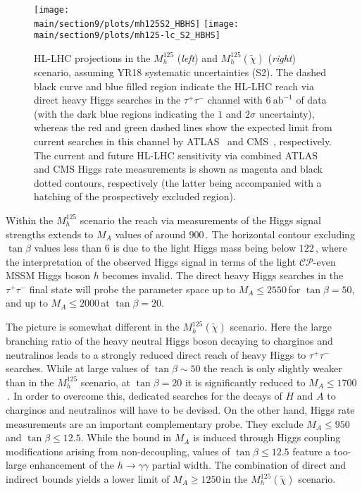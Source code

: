 \begin{figure}
\begin{center}
\texttt{[image: \\main/section9/plots/mh125S2\_HBHS]}\hfill
\texttt{[image: \\main/section9/plots/mh125-lc\_S2\_HBHS]}
\end{center}
\caption{HL-LHC projections in the $M_h^{125}$ (\emph{left}) and
  $M_h^{125}(\tilde{\chi})$ (\emph{right}) scenario, assuming YR18 systematic uncertainties (S2). The dashed black curve and blue filled region indicate the HL-LHC reach via direct heavy Higgs searches in the $\tau^+\tau^-$ channel with $6~\mathrm{ab}^{-1}$ of data (with the dark blue regions indicating the $1$ and $2\sigma$ uncertainty), whereas 
  the red and green dashed lines show the expected limit from current searches in this channel by ATLAS~\cite{Aaboud:2017sjh} and CMS~\cite{Sirunyan:2018zut}, respectively. The current and future HL-LHC sensitivity via  combined ATLAS and CMS Higgs rate measurements is shown as magenta and black dotted contours, respectively (the latter being accompanied with a hatching of the prospectively excluded region).}
\label{fig:bench}
\end{figure}

Within the $M_h^{125}$ scenario the reach via measurements of the Higgs signal strengths extends to $M_A$ values of around $900$\,\UGeV. The horizontal contour excluding $\tan\beta$ values less than 6 is due to the light Higgs mass being below $122$\,\UGeV, where the interpretation of the observed Higgs signal in terms of the light $\mathcal{CP}$-even MSSM Higgs boson $h$ becomes invalid. The direct heavy Higgs searches in the $\tau^+\tau^-$ final state will probe the parameter space up to $M_A \le 2550$\,\UGeV for $\tan\beta = 50$, and up to $M_A \le 2000$\,\UGeV at $\tan\beta = 20$. 

The picture is somewhat different in the $M_h^{125}(\tilde{\chi})$ scenario. Here the large branching ratio of the heavy neutral Higgs boson decaying to charginos and neutralinos leads to a strongly reduced direct reach of heavy Higgs to $\tau^+\tau^-$ searches. While at large values of $\tan\beta \sim 50$  the reach is only slightly weaker than in the $M_h^{125}$ scenario, at $\tan\beta = 20$ it is significantly reduced to $M_A \le 1700$\,\UGeV. In order to overcome this, dedicated searches for the decays of $H$ and $A$ to charginos and neutralinos will have to be devised. On the other hand, Higgs rate measurements are an important complementary probe. They exclude
$M_A \le 950$\,\UGeV and $\tan\beta \le 12.5$. While the bound in $M_A$
is induced through Higgs coupling modifications arising from
non-decoupling, values of $\tan\beta\le 12.5$ feature a too-large enhancement of the $h\to \gamma\gamma$ partial width. The combination of direct and indirect bounds yields
a lower limit of $M_A \ge 1250$\,\UGeV in the $M_h^{125}(\tilde{\chi})$ scenario.


